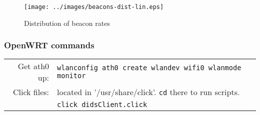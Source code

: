 \begin{figure}[H]
 \centering
 \texttt{[image: ../images/beacons-dist-lin.eps]}
 \caption{Distribution of beacon rates}
 \label{fig:beacons-dist-lin}
\end{figure}

\subsubsection{OpenWRT commands}
\begin{tabular}{r p{350px}}
Get ath0 up:	&	\texttt{wlanconfig ath0 create wlandev wifi0 wlanmode monitor}  	\\
Click files:	&	located in '/usr/share/click'. \texttt{cd} there to run scripts.	\\
		&	\texttt{click didsClient.click}						\\
\end{tabular}